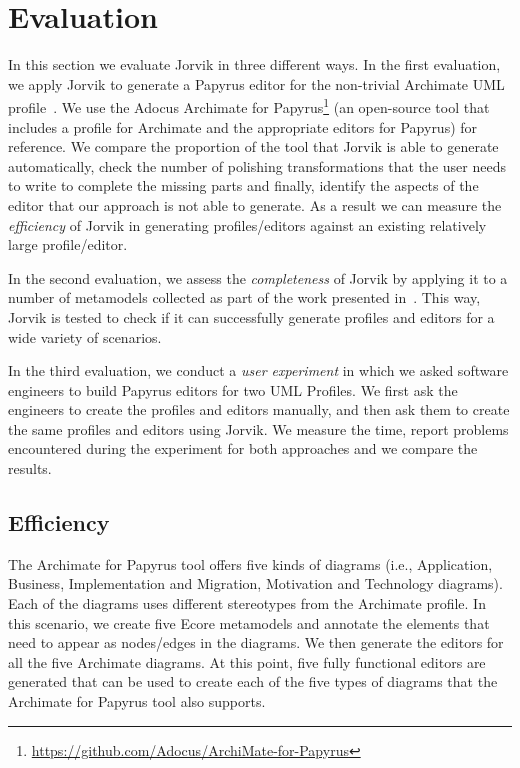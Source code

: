 \section{Evaluation}
\label{sec:evaluation}

In this section we evaluate Jorvik in three different ways. 
In the first evaluation, we apply Jorvik to generate a Papyrus editor for the non-trivial Archimate UML profile~\cite{iacob2009archimate,haren2012archimate}. 
We use the Adocus Archimate for Papyrus\footnote{\url{https://github.com/Adocus/ArchiMate-for-Papyrus}} (an open-source tool that includes a profile for Archimate and the appropriate editors for Papyrus) for reference. 
We compare the proportion of the tool that Jorvik is able to generate automatically, check the number of polishing transformations that the user needs to write to complete the missing parts and finally, identify the aspects of the editor that our approach is not able to generate.
As a result we can measure the \textit{efficiency} of Jorvik in generating profiles/editors against an existing relatively large profile/editor. 

In the second evaluation, we assess the \textit{completeness} of Jorvik by applying it to a number of metamodels collected as part of the work presented in~\cite{williams2013metamodels}. 
This way, Jorvik is tested to check if it can successfully generate profiles and editors for a wide variety of scenarios.

In the third evaluation, we conduct a \textit{user experiment} in which we asked software engineers to build Papyrus editors for two UML Profiles. 
We first ask the engineers to create the profiles and editors manually, and then ask them to create the same profiles and editors using Jorvik. 
We measure the time, report problems encountered during the experiment for both approaches and we compare the results.

\subsection{Efficiency}
\label{sec:efficiencyEvaluation}
The Archimate for Papyrus tool offers five kinds of diagrams (i.e., Application, Business, Implementation and Migration, Motivation and Technology diagrams). 
Each of the diagrams uses different stereotypes from the Archimate profile. 
In this scenario, we create five Ecore metamodels and annotate the elements that need to appear as nodes/edges in the diagrams. 
We then generate the editors for all the five Archimate diagrams.
At this point, five fully functional editors are generated that can be used to create each of the five types of diagrams that the Archimate for Papyrus tool also supports. 

